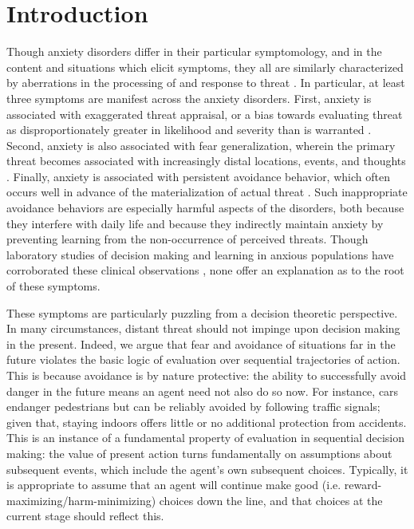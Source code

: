 \documentclass[11pt]{article} %
\begin{document}
\startmain

\section{Introduction}

Though anxiety disorders differ in their particular symptomology, and in the content and situations which elicit symptoms, they all are similarly characterized by aberrations in the processing of and response to threat \citep{dsm5}. In particular, at least three symptoms are manifest across the anxiety disorders. First, anxiety is associated with exaggerated threat appraisal, or a bias towards evaluating threat as disproportionately greater in likelihood and severity than is warranted \citep{ClarkBeck2011}. Second, anxiety is also associated with fear generalization, wherein the primary threat becomes associated with increasingly distal locations, events, and thoughts \citep{dymond2015}. Finally, anxiety is associated with persistent avoidance behavior, which often occurs well in advance of the materialization of actual threat \citep{Arnaudova2017}. Such inappropriate avoidance behaviors are especially harmful aspects of the disorders, both because they interfere with daily life and because they indirectly maintain anxiety by preventing learning from the non-occurrence of perceived threats. Though laboratory studies of decision making and learning in anxious populations have corroborated these clinical observations \citep{Harle2017, norbury2018, Aylward2019}, none offer an explanation as to the root of these symptoms.

These symptoms are particularly puzzling from a decision theoretic perspective\citep{huys2015}. In many circumstances, distant threat should not impinge upon decision making in the present. Indeed, we argue that fear and avoidance of situations far in the future violates the basic logic of evaluation over sequential trajectories of action. This is because avoidance is by nature protective: the ability to successfully avoid danger in the future means an agent need not also do so now. For instance, cars endanger pedestrians but can be reliably avoided by following traffic signals; given that, staying indoors offers little or no additional protection from accidents. This is an instance of a fundamental property of evaluation in sequential decision making: the value of present action turns fundamentally on assumptions about subsequent events, which include the agent's own subsequent choices. Typically, it is appropriate to assume that an agent will continue make good (i.e. reward-maximizing/harm-minimizing) choices down the line, and that choices at the current stage should reflect this.
\end{document}
